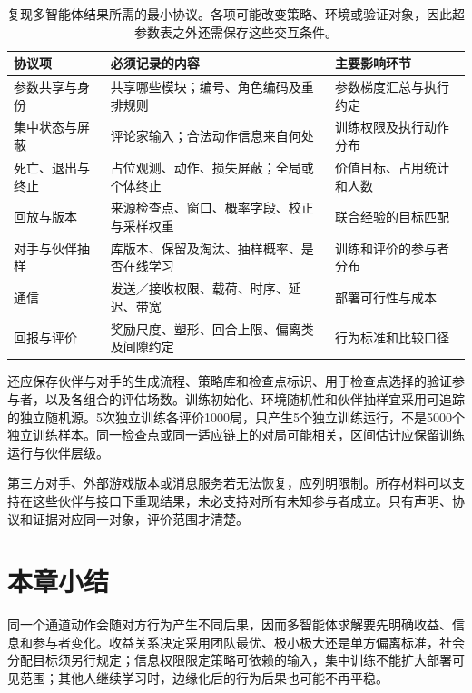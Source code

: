 \begin{table}[htbp]
 \centering
 \begin{tabularx}{\linewidth}{@{}l >{\raggedright\arraybackslash}X >{\raggedright\arraybackslash}X@{}}
 \toprule
 协议项 & 必须记录的内容 & 主要影响环节\\
 \midrule
 参数共享与身份 & 共享哪些模块；编号、角色编码及重排规则 & 参数梯度汇总与执行约定\\
 集中状态与屏蔽 & 评论家输入；合法动作信息来自何处 & 训练权限及执行动作分布\\
 死亡、退出与终止 & 占位观测、动作、损失屏蔽；全局或个体终止 & 价值目标、占用统计和人数\\
 回放与版本 & 来源检查点、窗口、概率字段、校正与采样权重 & 联合经验的目标匹配\\
 对手与伙伴抽样 & 库版本、保留及淘汰、抽样概率、是否在线学习 & 训练和评价的参与者分布\\
 通信 & 发送／接收权限、载荷、时序、延迟、带宽 & 部署可行性与成本\\
 回报与评价 & 奖励尺度、塑形、回合上限、偏离类及间隙约定 & 行为标准和比较口径\\
 \bottomrule
 \end{tabularx}
 \caption{复现多智能体结果所需的最小协议。各项可能改变策略、环境或验证对象，因此超参数表之外还需保存这些交互条件。}
 \label{tab:rl-multi-agent-protocol}
\end{table}

还应保存伙伴与对手的生成流程、策略库和检查点标识、用于检查点选择的验证参与者，以及各组合的评估场数。训练初始化、环境随机性和伙伴抽样宜采用可追踪的独立随机源。5次独立训练各评价1000局，只产生5个独立训练运行，不是5000个独立训练样本。同一检查点或同一适应链上的对局可能相关，区间估计应保留训练运行与伙伴层级。

第三方对手、外部游戏版本或消息服务若无法恢复，应列明限制。所存材料可以支持在这些伙伴与接口下重现结果，未必支持对所有未知参与者成立。只有声明、协议和证据对应同一对象，评价范围才清楚。

\section{本章小结}
\label{sec:rl-multi-agent-summary}

同一个通道动作会随对方行为产生不同后果，因而多智能体求解要先明确收益、信息和参与者变化。收益关系决定采用团队最优、极小极大还是单方偏离标准，社会分配目标须另行规定；信息权限限定策略可依赖的输入，集中训练不能扩大部署可见范围；其他人继续学习时，边缘化后的行为后果也可能不再平稳。

